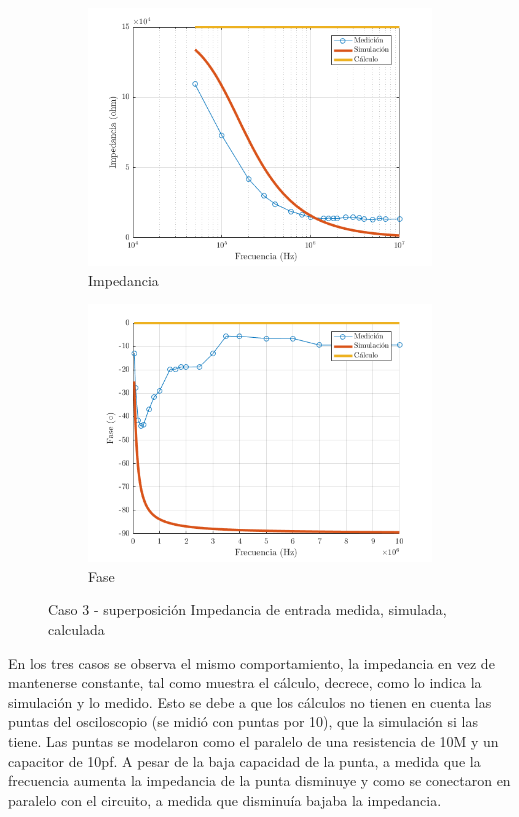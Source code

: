 \documentclass[../../main.tex]{subfiles}
\begin{document}
\begin{figure}[H]
\centering
\begin{subfigure}[http]{0.49\textwidth}
\includegraphics[width=\textwidth]{z_n_r_c3}
\caption{Impedancia}\label{fig=znZc3}
\end{subfigure}
\begin{subfigure}[http]{0.49\textwidth}
\includegraphics[width=\textwidth]{z_n_f_c3}
\caption{Fase} \label{fig=znFc3}
\end{subfigure}
\caption{Caso 3 - superposición Impedancia de entrada  medida, simulada, calculada}
\end{figure}

En los tres casos se observa el mismo comportamiento, la impedancia en vez de mantenerse constante, tal como muestra el cálculo, decrece, como lo indica la simulación y lo medido. Esto se debe a que los cálculos no tienen en cuenta las puntas del osciloscopio (se midió con puntas por 10), que la simulación si las tiene. Las puntas se modelaron como el paralelo de una resistencia de 10M y un capacitor de 10pf. A pesar de la baja capacidad de la punta, a medida que la frecuencia aumenta la impedancia de la punta disminuye y como se conectaron en paralelo con el circuito, a medida que disminuía bajaba la impedancia.
\end{document}
